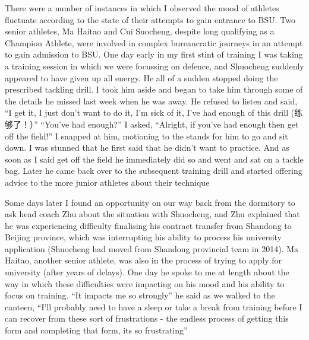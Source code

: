 \begin{CJK}{UTF8}{gbsn}


  There were a number of instances in which I observed the mood of athletes fluctuate according to the state of their attempts to gain entrance to BSU.  Two senior athletes, Ma Haitao and Cui Suocheng, despite long qualifying as a Champion Athlete, were involved in complex bureaucratic journeys in an attempt to gain admission to BSU.  One day early in my first stint of training I was taking a training session in which we were focussing on defence, and Shuocheng suddenly appeared to have given up all energy.  He all of a sudden stopped doing the prescribed tackling drill.  I took him aside and began to take him through some of the details he missed last week when he was away.  He refused to listen and said, “I get it, I just don’t want to do it, I’m sick of it, I’ve had enough of this drill (练够了！）”  “You’ve had enough?” I asked, “Alright, if you’ve had enough then get off the field!”  I snapped at him, motioning to the stands for him to go and sit down. I was stunned that he first said that he didn’t want to practice.  And as soon as I said get off the field he immediately did so and went and sat on a tackle bag.  Later he came back over to the subsequent training drill and started offering advice to the more junior athletes about their technique

  Some days later I found an opportunity on our way back from the dormitory to ask head coach Zhu about the situation with Shuocheng, and Zhu explained that he was experiencing difficulty finalising his contract transfer from Shandong to Beijing province, which was interrupting his ability to process his university application (Shuocheng had moved from Shandong provincial team in 2014).  Ma Haitao, another senior athlete, was also in the process of trying to apply for university (after years of delays).  One day he spoke to me at length about the way in which these difficulties were impacting on his mood and his ability to focus on training. ``It impacts me so strongly'' he said as we walked to the canteen, ``I’ll probably need to have a sleep or take a break from training before I can recover from these sort of frustrations - the endless process of getting this form and completing that form, its so frustrating''


\end{CJK}
